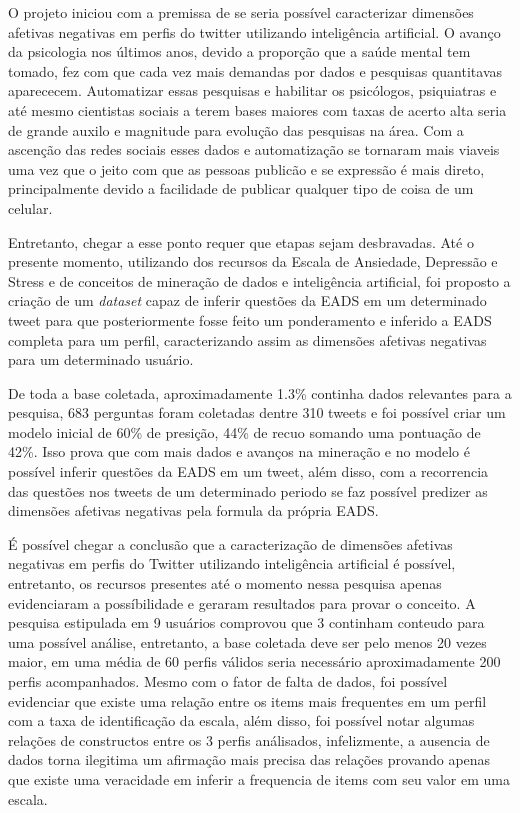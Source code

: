 O projeto iniciou com a premissa de se seria possível caracterizar dimensões afetivas negativas em perfis do twitter utilizando inteligência artificial. O avanço da psicologia nos últimos anos, devido a proporção que a saúde mental tem tomado, fez com que cada vez mais demandas por dados e pesquisas quantitavas aparececem. Automatizar essas pesquisas e habilitar os psicólogos, psiquiatras e até mesmo cientistas sociais a terem bases maiores com taxas de acerto alta seria de grande auxilo e magnitude para evolução das pesquisas na área. Com a ascenção das redes sociais esses dados e automatização se tornaram mais viaveis uma vez que o jeito com que as pessoas publicão e se expressão é mais direto, principalmente devido a facilidade de publicar qualquer tipo de coisa de um celular.

Entretanto, chegar a esse ponto requer que etapas sejam desbravadas. Até o presente momento, utilizando dos recursos da Escala de Ansiedade, Depressão e Stress e de conceitos de mineração de dados e inteligência artificial, foi proposto a criação de um \textit{dataset} capaz de inferir questões da EADS em um determinado tweet para que posteriormente fosse feito um ponderamento e inferido a EADS completa para um perfil, caracterizando assim as dimensões afetivas negativas para um determinado usuário.

De toda a base coletada, aproximadamente 1.3\% continha dados relevantes para a pesquisa, 683 perguntas foram coletadas dentre 310 tweets e foi possível criar um modelo inicial de 60\% de presição, 44\% de recuo somando uma pontuação de 42\%. Isso prova que com mais dados e avanços na mineração e no modelo é possível inferir questões da EADS em um tweet, além disso, com a recorrencia das questões nos tweets de um determinado periodo se faz possível predizer as dimensões afetivas negativas pela formula da própria EADS.

É possível chegar a conclusão que a caracterização de dimensões afetivas negativas em perfis do Twitter utilizando inteligência artificial é possível, entretanto, os recursos presentes até o momento nessa pesquisa apenas evidenciaram a possíbilidade e geraram resultados para provar o conceito. A pesquisa estipulada em 9 usuários comprovou que 3 continham conteudo para uma possível análise, entretanto, a base coletada deve ser pelo menos 20 vezes maior, em uma média de 60 perfis válidos seria necessário aproximadamente 200 perfis acompanhados. Mesmo com o fator de falta de dados, foi possível evidenciar que existe uma relação entre os items mais frequentes em um perfil com a taxa de identificação da escala, além disso, foi possível notar algumas relações de constructos entre os 3 perfis análisados, infelizmente, a ausencia de dados torna ilegitima um afirmação mais precisa das relações provando apenas que existe uma veracidade em inferir a frequencia de items com seu valor em uma escala.


